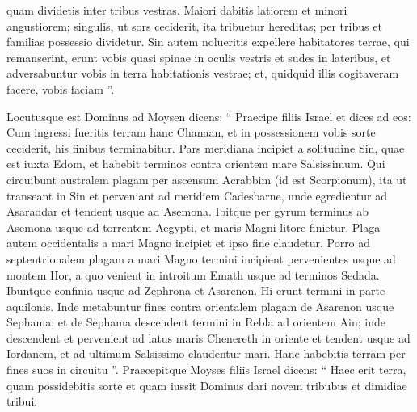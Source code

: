 \begin{biblechapter}
\begin{biblechapter}
\begin{biblechapter}
\begin{biblechapter}
\begin{biblechapter}
\begin{biblechapter}
\begin{biblechapter}
\begin{biblechapter}
\begin{biblechapter}
\begin{biblechapter}
\begin{biblechapter}
\begin{biblechapter}
\begin{biblechapter}
\begin{biblechapter}
\begin{biblechapter}
\begin{biblechapter}
\begin{biblechapter}
\begin{biblechapter}
\begin{biblechapter}
\begin{biblechapter}
\begin{biblechapter}
\begin{biblechapter}
\begin{biblechapter}
\begin{biblechapter}
\begin{biblechapter}
\begin{biblechapter}
\begin{biblechapter}
\begin{biblechapter}
\begin{biblechapter}
\begin{biblechapter}
\begin{biblechapter}
\begin{biblechapter}
\begin{biblechapter}
\verse quam dividetis inter tribus vestras. Maiori dabitis latiorem et minori angustiorem; singulis, ut sors ceciderit, ita tribuetur hereditas; per tribus et familias possessio dividetur. 
\verse Sin autem nolueritis expellere habitatores terrae, qui remanserint, erunt vobis quasi spinae in oculis vestris et sudes in lateribus, et adversabuntur vobis in terra habitationis vestrae; 
\verse et, quidquid illis cogitaveram facere, vobis faciam ”.
 
\begin{biblechapter}
\verse Locutusque est Dominus ad Moysen dicens: 
\verse “ Praecipe filiis Israel et dices ad eos: Cum ingressi fueritis terram hanc Chanaan, et in possessionem vobis sorte ceciderit, his finibus terminabitur.
 \verse Pars meridiana incipiet a solitudine Sin, quae est iuxta Edom, et habebit terminos contra orientem mare Salsissimum. 
\verse Qui circuibunt australem plagam per ascensum Acrabbim (id est Scorpionum), ita ut transeant in Sin et perveniant ad meridiem Cadesbarne, unde egredientur ad Asaraddar et tendent usque ad Asemona. 
\verse Ibitque per gyrum terminus ab Asemona usque ad torrentem Aegypti, et maris Magni litore finietur.
 \verse Plaga autem occidentalis a mari Magno incipiet et ipso fine claudetur.
 \verse Porro ad septentrionalem plagam a mari Magno termini incipient pervenientes usque ad montem Hor, 
\verse a quo venient in introitum Emath usque ad terminos Sedada. 
\verse Ibuntque confinia usque ad Zephrona et Asarenon. Hi erunt termini in parte aquilonis.
 \verse Inde metabuntur fines contra orientalem plagam de Asarenon usque Sephama; 
 \verse et de Sephama descendent termini in Rebla ad orientem Ain; inde descendent et pervenient ad latus maris Chenereth in oriente 
\verse et tendent usque ad Iordanem, et ad ultimum Salsissimo claudentur mari.
 Hanc habebitis terram per fines suos in circuitu ”.
 \verse Praecepitque Moyses filiis Israel dicens: “ Haec erit terra, quam possidebitis sorte et quam iussit Dominus dari novem tribubus et dimidiae tribui. 

\end{biblechapter}
\end{biblechapter}
\end{biblechapter}
\end{biblechapter}
\end{biblechapter}
\end{biblechapter}
\end{biblechapter}
\end{biblechapter}
\end{biblechapter}
\end{biblechapter}
\end{biblechapter}
\end{biblechapter}
\end{biblechapter}
\end{biblechapter}
\end{biblechapter}
\end{biblechapter}
\end{biblechapter}
\end{biblechapter}
\end{biblechapter}
\end{biblechapter}
\end{biblechapter}
\end{biblechapter}
\end{biblechapter}
\end{biblechapter}
\end{biblechapter}
\end{biblechapter}
\end{biblechapter}
\end{biblechapter}
\end{biblechapter}
\end{biblechapter}
\end{biblechapter}
\end{biblechapter}
\end{biblechapter}
\end{biblechapter}
